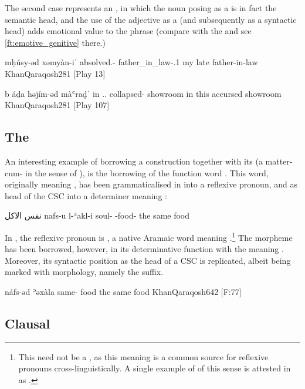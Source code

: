 The second case represents an , in which the noun posing as a \secn is in fact the semantic head, and the use of the adjective as a \prim (and subsequently as a syntactic head) adds emotional value to the phrase (compare with the \JZax {}  and see \ref{ft:emotive_genitive} there.) 

{mḥúsy-əd xəmyàn-iˈ}
{absolved.\masc-\cst{} father\_in\_law-\poss.1\sg}
{my late father-in-law}
{KhanQaraqosh}{281 {[Play 13]}}

{b\cb{} áḏa həjím-əd màʿraḏ̣ˈ}
{in\cb{} \dem.\near.\masc{} collapsed-\cst{} showroom}
{in this accursed showroom}
{KhanQaraqosh}{281 {[Play 107]}}

\subsection{The \prim {}} \label{ss:Qar_nafs}

An interesting  example of borrowing a \cst* construction together with 
its \prim (a matter-cum- in the sense of \cite{SakelTypes}), is the borrowing of the  function word . This word, originally meaning , has been grammaticalised in \Arab into a reflexive pronoun, and as head of the CSC into a determiner meaning :

{نفس الاكل}
{nafs-u l-ʾakl-i}
{soul-\nom{} -food-\gen}
{the same food}
{}

In \Qar, the reflexive pronoun is , a native Aramaic word meaning  \citep[see][84]{KhanQaraqosh}.\footnote{This need not be a , as this meaning is a common source for reflexive pronouns cross-linguistically. A single example of  of this sense is attested in \Qar as   \citep[739]{KhanQaraqosh}.} The morpheme  has been borrowed, however, in its determinative function with the meaning . Moreover, its syntactic position as the head of a CSC is replicated, albeit being marked with  morphology, namely the \cst* \ed suffix.

{náfs-əd ʾəxàla}
{same-\cst{} food}
{the same food}
{KhanQaraqosh}{642 {[F:77]}}

\subsection{Clausal \secns}

